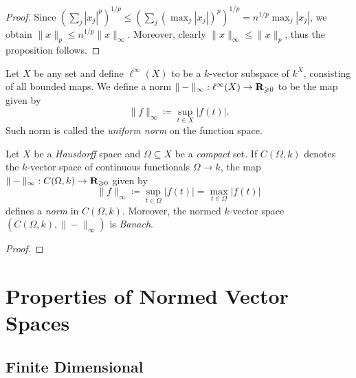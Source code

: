 \begin{proof}
Since \((\sum_j |x_j|^p)^{1/p} \leq (\sum_j (\max_j |x_j|)^p)^{1/p} = n^{1/p}
\max_j |x_j|\), we obtain \(\| x \|_p \leq n^{1/p} \| x \|_{\infty}\). Moreover,
clearly \(\| x \|_{\infty} \leq \| x \|_p\), thus the proposition follows.
\end{proof}

\begin{example}
\label{exp:ell-infty-space-maps}
Let \(X\) be any set and define \(\ell^{\infty}(X)\) to be a \(k\)-vector
subspace of \(k^X\), consisting of all bounded maps. We define a norm
\(\| - \|_{\infty}: \ell^{\infty}(X) \to \mathbf{R}_{\geqslant 0}\) to be the map given by
\[
\| f \|_{\infty} \coloneq \sup_{t \in X} |f(t)|.
\]
Such norm is called the \emph{uniform norm} on the function space.
\end{example}

\begin{example}
\label{exp:uniform-convergence-norm}
Let \(X\) be a \emph{Hausdorff} space and \(\Omega \subseteq X\) be a
\emph{compact} set. If \(C(\Omega, k)\) denotes the \(k\)-vector space of
continuous functionals \(\Omega \to k\), the map \(\| - \|_{\infty}: C(\Omega,
k) \to \mathbf{R}_{\geqslant 0}\) given by
\[
\| f \|_{\infty} \coloneq \sup_{t \in \Omega} |f(t)| = \max_{t \in \Omega} |f(t)|
\]
defines a \emph{norm} in \(C(\Omega, k)\). Moreover, the normed \(k\)-vector
space \((C(\Omega, k), \| - \|_{\infty})\) is \emph{Banach}.
\end{example}

\begin{proof}
\end{proof}


\section{Properties of Normed Vector Spaces}

\subsection{Finite Dimensional}

